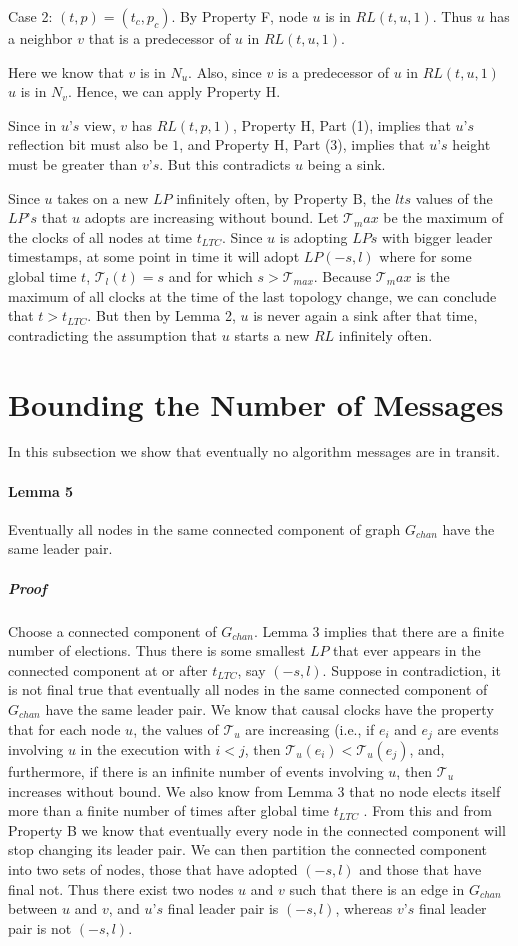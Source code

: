 Case 2: $(t, p) = (t_c , p_c )$. By Property F, node $u$ is in $RL (t, u, 1)$. Thus $u$ has a neighbor $v$ that is a predecessor of $u$ in $RL (t, u, 1)$.

Here we know that $v$ is in $N_u$. Also, since $v$ is a predecessor of $u$ in $RL (t, u, 1)$ $u$ is in $N_v$. Hence, we can apply Property H.

Since in $u’s$ view, $v$ has $RL (t, p, 1)$, Property H, Part (1), implies that $u’s$ reflection bit must also be $1$, and Property H, Part (3), implies that $u’s$ height must be greater than $v’s$. But this contradicts $u$ being a sink.

Since $u$ takes on a new $LP$ infinitely often, by Property B, the $lts$ values of the $LP’s$ that $u$ adopts are increasing without bound. Let $\mathcal{T} _max$ be the maximum of the clocks of all nodes at time $t_{LTC}$. Since $u$ is adopting $LPs$ with bigger leader timestamps, at some point in time it will adopt $LP(-s, l)$ where for some global time $t$, $\mathcal{T}_l(t) = s$ and for which $s > \mathcal{T}_{max}$. Because $\mathcal{T}_max$ is the maximum of all clocks at the time of the last topology change, we can conclude that $t > t_{LTC}$. But then by Lemma 2, $u$ is never again a sink after that time, contradicting the assumption that $u$ starts a new $RL$ infinitely often.
\section{Bounding the Number of Messages}
In this subsection we show that eventually no algorithm messages are in transit.
\paragraph{Lemma 5} Eventually all nodes in the same connected component of graph $G_{chan}$ have the same leader pair.
\subparagraph{Proof}Choose a connected component of $G_{chan}$. Lemma 3 implies that there are a finite number of elections. Thus there is some smallest $LP$ that ever appears in the connected component at or after $t_{LTC}$, say $(-s, l)$. Suppose in contradiction, it is not final true that eventually all nodes in the same connected component of $G_{chan}$ have the same leader pair. We know that causal clocks have the property that for each node $u$, the values of $\mathcal{T} _u$ are increasing (i.e., if $e_i$ and $e_j$ are events involving $u$ in the execution with $i < j$, then $\mathcal{T} _u(e_i) < \mathcal{T} _u (e_j )$, and, furthermore, if there is an infinite number of events involving $u$, then $\mathcal{T}_u$ increases without bound. We also know from Lemma 3 that no node elects itself more than a finite number of times after global time $t_{LTC}$ . From this and from Property B we know that eventually every node in the connected component will stop changing its leader pair. We can then partition the connected component into two sets of nodes, those that have adopted $(-s, l)$ and those that have final not. Thus there exist two nodes $u$ and $v$ such that there is an edge in $G_{chan}$ between $u$ and $v$, and $u’s$ final leader pair is $(-s, l)$, whereas $v’s$ final leader pair is not $(-s, l)$.


